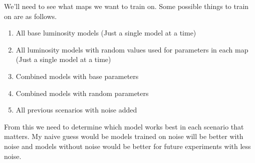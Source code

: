 \documentclass{article}
\begin{document}
		We'll need to see what maps we want to train on.  Some possible things to train on are as follows.
		\begin{enumerate}
			\item All base luminosity models (Just a single model at a time)

			\item All luminosity models with random values used for parameters in each map (Just a single model at a time)

			\item Combined models with base parameters

			\item Combined models with random parameters

			\item All previous scenarios with noise added
		\end{enumerate}
		From this we need to determine which model works best in each scenario that matters.  My naive guess would be models trained on noise will be better with noise and models without noise would be better for future experiments with less noise.
\end{document}
